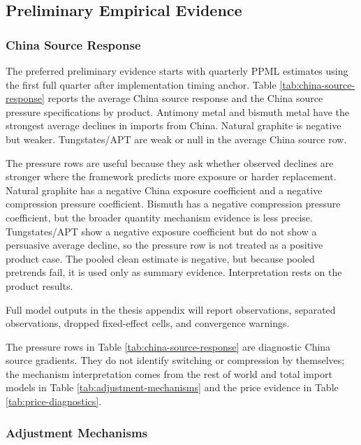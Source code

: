 \documentclass[12pt,a4paper]{article}
\numberwithin{equation}{section}
\begin{document}
\subsection{Preliminary Empirical Evidence}

\subsubsection{China Source Response}

The preferred preliminary evidence starts with quarterly PPML estimates using the first full quarter after implementation timing anchor. Table \ref{tab:china-source-response} reports the average China source response and the China source pressure specifications by product. Antimony metal and bismuth metal have the strongest average declines in imports from China. Natural graphite is negative but weaker. Tungstates/APT are weak or null in the average China source row.

The pressure rows are useful because they ask whether observed declines are stronger where the framework predicts more exposure or harder replacement. Natural graphite has a negative China exposure coefficient and a negative compression pressure coefficient. Bismuth has a negative compression pressure coefficient, but the broader quantity mechanism evidence is less precise. Tungstates/APT show a negative exposure coefficient but do not show a persuasive average decline, so the pressure row is not treated as a positive product case. The pooled clean estimate is negative, but because pooled pretrends fail, it is used only as summary evidence. Interpretation rests on the product results.

Full model outputs in the thesis appendix will report observations, separated observations, dropped fixed-effect cells, and convergence warnings.



The pressure rows in Table \ref{tab:china-source-response} are diagnostic China source gradients. They do not identify switching or compression by themselves; the mechanism interpretation comes from the rest of world and total import models in Table \ref{tab:adjustment-mechanisms} and the price evidence in Table \ref{tab:price-diagnostics}.

\subsubsection{Adjustment Mechanisms}
\end{document}
